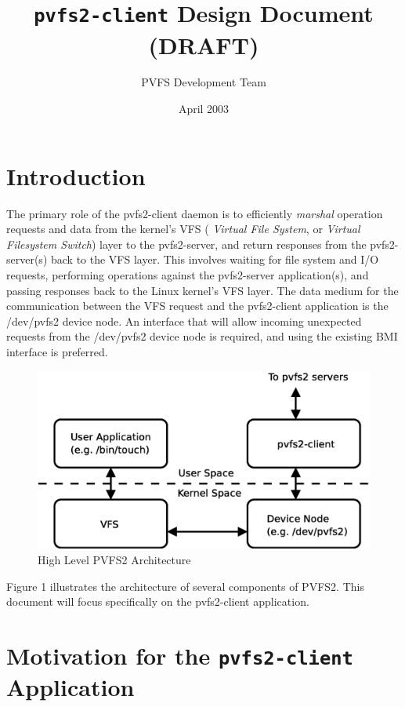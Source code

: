 \documentclass[11pt]{article}
\title{\texttt{pvfs2-client} Design Document (DRAFT)}
\author{PVFS Development Team}
\date{April 2003}
\begin{document}
\maketitle

\section{Introduction}

The primary role of the pvfs2-client daemon is to efficiently {\it
marshal} operation requests and data from the kernel's VFS ({\it
Virtual File System}, or {\it Virtual Filesystem Switch}) layer to
the pvfs2-server, and return responses from the pvfs2-server(s)
back to the VFS layer.  This involves waiting for file system and
I/O requests, performing operations against the  pvfs2-server
application(s), and passing responses back to the Linux kernel's VFS
layer.  The data medium for the communication between the VFS request
and the pvfs2-client application is the /dev/pvfs2 device node.  An
interface that will allow incoming unexpected requests from the
/dev/pvfs2 device node is required, and using the existing BMI
interface is preferred.

\begin{figure}
\begin{center}
\includegraphics[scale=0.4]{pvfs2-vfs.eps}
\end{center}
\caption{High Level PVFS2 Architecture}
\label{figure:arch}
\end{figure}

Figure 1 illustrates the architecture of several components of
PVFS2.  This document will focus specifically on the pvfs2-client
application.

\section{Motivation for the \texttt{pvfs2-client} Application}
\end{document}
